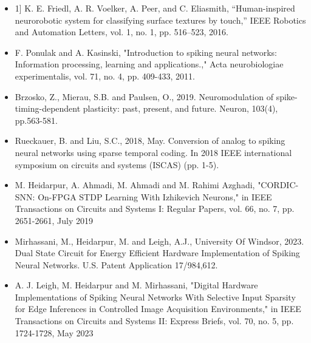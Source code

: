{\footnotesize
\begin {itemize}
\item [] 1] K. E. Friedl, A. R. Voelker, A. Peer, and C. Eliasmith, “Human-inspired neurorobotic system for classifying surface textures
by touch,” IEEE Robotics and Automation Letters, vol. 1, no. 1, pp. 516–523, 2016.
\item [] [2] F. Ponulak and A. Kasinski, "Introduction to spiking neural networks: Information processing, learning and applications.,"
Acta neurobiologiae experimentalis, vol. 71, no. 4, pp. 409-433, 2011.
\item [] [3]  Brzosko, Z., Mierau, S.B. and Paulsen, O., 2019. Neuromodulation of spike-timing-dependent plasticity: past, present, and future. Neuron, 103(4), pp.563-581.
\item [] [4] Rueckauer, B. and Liu, S.C., 2018, May. Conversion of analog to spiking neural networks using sparse temporal coding. In 2018 IEEE international symposium on circuits and systems (ISCAS) (pp. 1-5).
\item [] [4] M. Heidarpur, A. Ahmadi, M. Ahmadi and M. Rahimi Azghadi, "CORDIC-SNN: On-FPGA STDP Learning With Izhikevich Neurons," in IEEE Transactions on Circuits and Systems I: Regular Papers, vol. 66, no. 7, pp. 2651-2661, July 2019
\item [] [5] Mirhassani, M., Heidarpur, M. and Leigh, A.J., University Of Windsor, 2023. Dual State Circuit for Energy Efficient Hardware Implementation of Spiking Neural Networks. U.S. Patent Application 17/984,612.
\item [] [6] A. J. Leigh, M. Heidarpur and M. Mirhassani, "Digital Hardware Implementations of Spiking Neural Networks With Selective Input Sparsity for Edge Inferences in Controlled Image Acquisition Environments," in IEEE Transactions on Circuits and Systems II: Express Briefs, vol. 70, no. 5, pp. 1724-1728, May 2023
\end {itemize}
}
